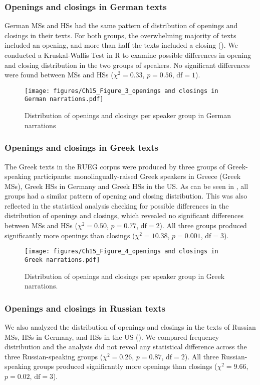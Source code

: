 \documentclass[output=paper,colorlinks,citecolor=brown]{langscibook}
\begin{document}
\subsubsection{Openings and closings in German texts}
German MSs and HSs had the same pattern of distribution of openings and closings in their texts. For both groups, the overwhelming majority of texts included an opening, and more than half the texts included a closing (). We conducted a Kruskal-Wallis Test in R \parencite{rstudio_team_rstudio_2020} to examine possible differences in opening and closing distribution in the two groups of speakers. No significant differences were found between MSs and HSs ($\chi^2 = 0.33$, $p = 0.56$, $\text{df} = 1$).

\begin{figure}
    \centering
    \texttt{[image: figures/Ch15\_Figure\_3\_openings and closings in German narrations.pdf]}
    \caption{Distribution of openings and closings per speaker group in German narrations}
    \label{fig:katsikaetal:Germanopeningsclosings}
\end{figure}

\subsubsection{Openings and closings in Greek texts}
The Greek texts in the RUEG corpus were produced by three groups of Greek-speaking participants: monolingually-raised Greek speakers in Greece (Greek MSs), Greek HSs in Germany and Greek HSs in the US. As can be seen in , all groups had a similar pattern of opening and closing distribution. This was also reflected in the statistical analysis checking for possible differences in the distribution of openings and closings, which revealed no significant differences between MSs and HSs ($\chi^2 = 0.50$, $p = 0.77$, $\text{df} = 2$). All three groups produced significantly more openings than closings ($\chi^2= 10.38$, $p = 0.001$, $\text{df} = 3$). 

\begin{figure}
    \centering
    \texttt{[image: figures/Ch15\_Figure\_4\_openings and closings in Greek narrations.pdf]}
    \caption{Distribution of openings and closings per speaker group in Greek narrations.}
    \label{fig:katsikaetal:Greekopeningsclosings}
\end{figure}

\subsubsection{Openings and closings in Russian texts}
We also analyzed the distribution of openings and closings in the texts of Russian MSs, HSs in Germany, and HSs in the US (). We compared frequency distribution and the analysis did not reveal any statistical difference across the three Russian-speaking groups ($\chi^2 = 0.26$, $p = 0.87$, $\text{df} = 2$). All three Russian-speaking groups produced significantly more openings than closings ($\chi^2 = 9.66$, $p = 0.02$, $\text{df} = 3$).
\end{document}
